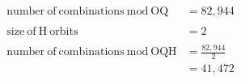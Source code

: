 \documentclass[preview, border=2mm]{standalone}
\begin{document}
\vspace*{\fill}

{\fontsize{32pt}{40pt}\selectfont
    \begin{align*}
        \mathrm{number\ of\ combinations\ mod\ OQ} &= 82,944 \\
        \\
        \mathrm{size\ of\ H\ orbits} &= 2 \\
        \\
        \mathrm{number\ of\ combinations\ mod\ OQH} &= \frac{82,944}{2} \\
            &= 41,472
    \end{align*}
}

\vspace*{\fill}
\end{document}
